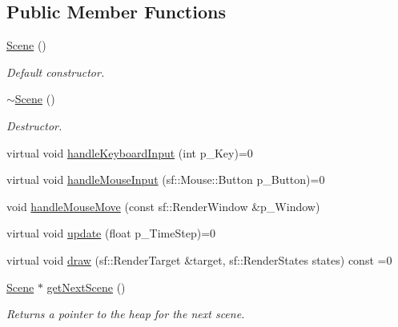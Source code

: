 \subsection*{Public Member Functions}
\begin{DoxyCompactItemize}
\item 
\mbox{\label{class_scene_ad10176d75a9cc0da56626f682d083507}} 
\hyperlink{class_scene_ad10176d75a9cc0da56626f682d083507}{Scene} ()
\begin{DoxyCompactList}\small\item\em Default constructor. \end{DoxyCompactList}\item 
\mbox{\label{class_scene_a3b8cec2e32546713915f8c6303c951f1}} 
\hyperlink{class_scene_a3b8cec2e32546713915f8c6303c951f1}{$\sim$\+Scene} ()
\begin{DoxyCompactList}\small\item\em Destructor. \end{DoxyCompactList}\item 
virtual void \hyperlink{class_scene_a182f90e2638c0da6a8ba2eab7cdc73ae}{handle\+Keyboard\+Input} (int p\+\_\+\+Key)=0
\item 
virtual void \hyperlink{class_scene_ad9240c92a58c4dba4c2409ec8bcff686}{handle\+Mouse\+Input} (sf\+::\+Mouse\+::\+Button p\+\_\+\+Button)=0
\item 
void \hyperlink{class_scene_a2cdbd23d08e1faa0becceaf8bd130ac7}{handle\+Mouse\+Move} (const sf\+::\+Render\+Window \&p\+\_\+\+Window)
\item 
virtual void \hyperlink{class_scene_a461d21cd952c7dd0556850a3fc95a760}{update} (float p\+\_\+\+Time\+Step)=0
\item 
virtual void \hyperlink{class_scene_ac3fd1d41fa7b7516eeff009de7550552}{draw} (sf\+::\+Render\+Target \&target, sf\+::\+Render\+States states) const =0
\item 
\mbox{\label{class_scene_a6229a5c43e32fe5b92357e61850e8b0d}} 
\hyperlink{class_scene}{Scene} $\ast$ \hyperlink{class_scene_a6229a5c43e32fe5b92357e61850e8b0d}{get\+Next\+Scene} ()
\begin{DoxyCompactList}\small\item\em Returns a pointer to the heap for the next scene. \end{DoxyCompactList}\item 
\mbox{\label{class_scene_a67993233347f2f6ab2765598b627d9aa}} 

\end{DoxyCompactItemize}
